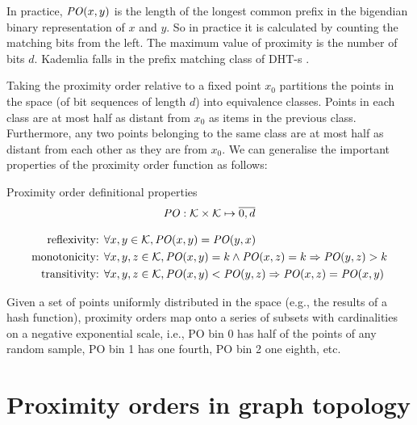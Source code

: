 In practice, $\mathit{PO}(x,y)$ is the length of the longest common prefix in the bigendian binary representation of $x$ and $y$. So in practice it is calculated by counting the matching bits from the left. The maximum value of proximity is the number of bits $d$. Kademlia falls in the prefix matching class of DHT-s \cite{rowstron2001pastry,zhao2004tapestry}.

Taking the proximity order relative to a fixed point $x_0$ partitions the points in
the space (of bit sequences of length $d$) into equivalence classes. Points in each class are at
most half as distant from $x_0$ as items in the previous class. Furthermore, any two points belonging to the same class are at most half as distant from each other as they are from $x_0$. We can generalise the important properties of the proximity order function as follows:

\begin{definition}{Proximity order definitional properties}\label{def:PO}
\begin{equation}
\mathit{PO}: \mathcal{K}\times \mathcal{K}\mapsto \overline{0,d}
\end{equation}

\begin{subequations}
  \begin{align}
    \label{eq:PO-constraint-symmetry} \text{reflexivity:  }&\forall x,y\in \mathcal{K}, \mathit{PO}(x,y)=\mathit{PO}(y,x)\\
    \label{eq:PO-constraint-monotonicity}\text{monotonicity:   }&\forall x,y,z\in \mathcal{K}, \mathit{PO}(x,y)=k \land  \mathit{PO}(x,z)=k \Rightarrow  \mathit{PO}(y,z)>k\\
\label{eq:PO-constraint-transitivity}\text{transitivity:   }&\forall x,y,z\in \mathcal{K}, \mathit{PO}(x,y)<\mathit{PO}(y,z) \Rightarrow \mathit{PO}(x,z)=\mathit{PO}(x,y)
   \end{align}
\end{subequations}
\end{definition}

Given a set of points uniformly distributed in the space (e.g., the results of a hash function), proximity orders map onto a series of subsets with cardinalities on a negative exponential scale, i.e., PO bin 0 has half of the points of any random sample, PO bin 1 has one fourth, PO bin 2 one eighth, etc.

\section{Proximity orders in graph topology \statusgreen}

